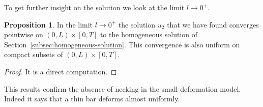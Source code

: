 \documentclass[a4paper,10pt,oneside]{amsbook}
\numberwithin{section}{chapter}
\numberwithin{equation}{chapter}
\theoremstyle{definition}
\newtheorem{prop}{Proposition}[chapter]
\begin{document}
To get further insight on the solution we look at the limit $l\to0^+$.
\begin{prop}
In the limit $l\to0^+$ the solution $u_2$ that we have found converges pointwise on $(0,L)\times[0,T]$ to the homogeneous solution of Section~\ref{subsec:homogeneous-solution}. This convergence is also uniform on compact subsets of $(0,L)\times[0,T]$.
\end{prop}
\begin{proof}
It is a direct computation.
\end{proof}
This results confirm the absence of necking in the small deformation model. Indeed it says that a thin bar deforms almost uniformly.

%
\end{document}
